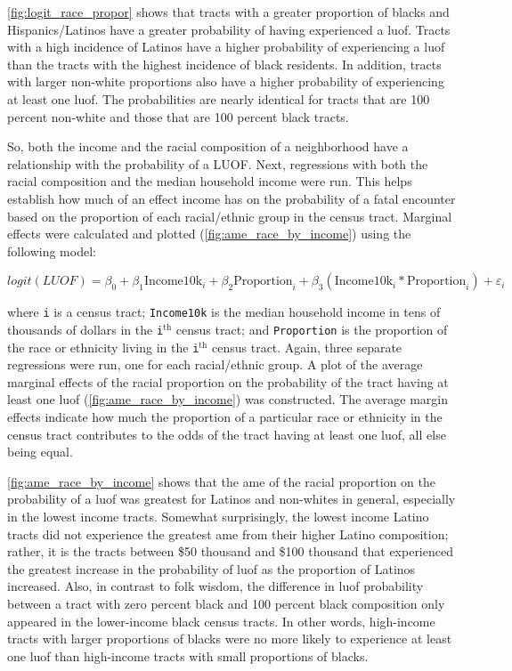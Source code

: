 \documentclass[12pt]{article}
\begin{document}
\autoref{fig:logit_race_propor} shows that tracts with a greater proportion of blacks and Hispanics/Latinos have a greater probability of having experienced a \acrfull{luof}. Tracts with a high incidence of Latinos have a higher probability of experiencing a \acrshort{luof} than the tracts with the highest incidence of black residents. In addition, tracts with larger non-white proportions also have a higher probability of experiencing at least one \acrshort{luof}. The probabilities are nearly identical for tracts that are 100 percent non-white and those that are 100 percent black tracts.

So, both the income and the racial composition of a neighborhood have a relationship with the probability of a LUOF. Next, regressions with both the racial composition and the median household income were run. This helps establish how much of an effect income has on the probability of a fatal encounter based on the proportion of each racial/ethnic group in the census tract. Marginal effects were calculated and plotted (\autoref{fig:ame_race_by_income}) using the following model:

\begin{equation}
logit(LUOF) = \beta_0 + \beta_1 \text{Income10k}_i + \beta_2 \text{Proportion}_i + \beta_3 (\text{Income10k}_i \ast \text{Proportion}_i) + \varepsilon_i
\label{eq:logit_interaction}
\end{equation}

\noindent{}where \texttt{i} is a census tract; \texttt{Income10k} is the median household income in tens of thousands of dollars in the \texttt{i}$^\text{th}$ census tract; and \texttt{Proportion} is the proportion of the race or ethnicity living in the \texttt{i}$^\text{th}$ census tract. Again, three separate regressions were run, one for each racial/ethnic group. A plot of the average marginal effects of the racial proportion on the probability of the tract having at least one \acrshort{luof} (\autoref{fig:ame_race_by_income}) was constructed. The average margin effects indicate how much the proportion of a particular race or ethnicity in the census tract contributes to the odds of the tract having at least one \acrshort{luof}, all else being equal.

\autoref{fig:ame_race_by_income} shows that the \gls{ame} of the racial proportion on the probability of a \acrshort{luof} was greatest for Latinos and non-whites in general, especially in the lowest income tracts. Somewhat surprisingly, the lowest income Latino tracts did not experience the greatest \acrshort{ame} from their higher Latino composition; rather, it is the tracts between \$50 thousand and \$100 thousand that experienced the greatest increase in the probability of \acrshort{luof} as the proportion of Latinos increased. Also, in contrast to folk wisdom, the difference in \acrshort{luof} probability between a tract with zero percent black and 100 percent black composition only appeared in the lower-income black census tracts. In other words, high-income tracts with larger proportions of blacks were no more likely to experience at least one \acrshort{luof} than high-income tracts with small proportions of blacks.
\end{document}
